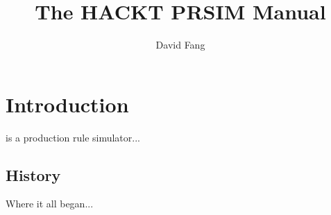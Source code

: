 \documentclass[12pt]{article}
\begin{document}
\title{The HACKT PRSIM Manual}
\author{David Fang}

\maketitle



\section{Introduction}
\label{sec:intro}

 is a production rule simulator...

\subsection{History}
\label{sec:intro:history}

Where it all began...

% 
% 
% 
% 
% 
% 
% 
% 
% 
% 
% 
% 
% 

% 

\end{document}
